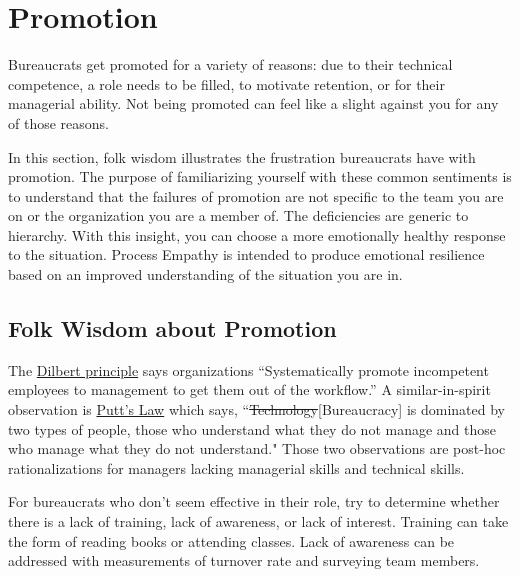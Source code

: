 \section{Promotion\label{sec:promotion}}

Bureaucrats get promoted for a variety of reasons: due to their technical competence, a role needs to be filled, to motivate retention, or for their managerial ability.  Not being promoted can feel like a slight against you for any of those reasons. 

In this section, folk wisdom illustrates the frustration bureaucrats have with promotion. The purpose of familiarizing yourself with these common sentiments is to understand that the failures of promotion are not specific to the team you are on or the organization you are a member of. The deficiencies are generic to hierarchy. With this insight, you can choose a more emotionally healthy response to the situation. Process Empathy is intended to produce emotional resilience based on an improved understanding of the situation you are in.

\subsection*{Folk Wisdom about Promotion}

The 
\href{https://en.wikipedia.org/wiki/Dilbert_principle}{Dilbert principle}
%
%
%
says organizations
``Systematically promote incompetent employees to management to get them out of the workflow.''
A similar-in-spirit observation is 
\href{https://en.wikipedia.org/wiki/Putt\%27s_Law_and_the_Successful_Technocrat}{Putt's Law}
%
%
which says,
``\sout{Technology}[Bureaucracy] is dominated by two types of people, those who understand what they do not manage and those who manage what they do not understand."
Those two observations are post-hoc rationalizations for managers lacking managerial skills and technical skills. 

For bureaucrats who don't seem effective in their role, try to determine whether there is a lack of training, lack of awareness, or lack of interest. Training can take the form of reading books or attending classes. Lack of awareness can be addressed with measurements of turnover rate and surveying team members. 


